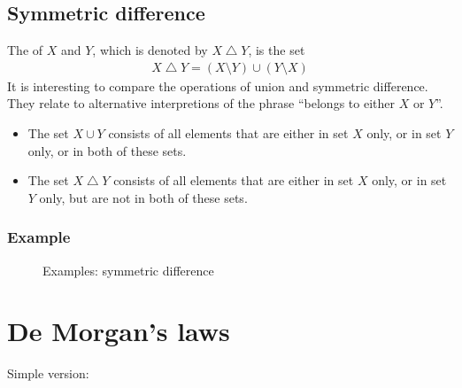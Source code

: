 \documentclass[letterpaper,10pt,english]{jupyterBook}
\begin{document}
\subsection{Symmetric difference}
\label{\detokenize{02.sets_numbers_coordinates_distances:symmetric-difference}}
\sphinxAtStartPar
The  of \(X\) and \(Y\), which is denoted by \(X \bigtriangleup Y\), is
the set
\begin{equation*}
\begin{split}X \bigtriangleup Y = (X \setminus Y) \cup (Y \setminus X)\end{split}
\end{equation*}
\sphinxAtStartPar
It is interesting to compare the operations of union and symmetric difference. They relate to alternative interpretions of the phrase “belongs to either \(X\) or \(Y\)”.
\begin{itemize}
\item {} 
\sphinxAtStartPar
The set \(X \cup Y\) consists of all elements that are either in set \(X\) only, or in set \(Y\) only, or in both of these sets.

\item {} 
\sphinxAtStartPar
The set \(X \bigtriangleup Y\) consists of all elements that are either in set \(X\) only, or in set \(Y\) only, but are not in both of these sets.

\end{itemize}

\sphinxAtStartPar
{}


\subsubsection{Example}
\label{\detokenize{02.sets_numbers_coordinates_distances:example}}
\begin{figure}[htbp]
\centering
\capstart

\noindent{}
\caption{Examples: symmetric difference}\label{\detokenize{02.sets_numbers_coordinates_distances:id7}}\end{figure}


\section{De Morgan’s laws}
\label{\detokenize{02.sets_numbers_coordinates_distances:de-morgan-s-laws}}
\sphinxAtStartPar
Simple version:
\end{document}
